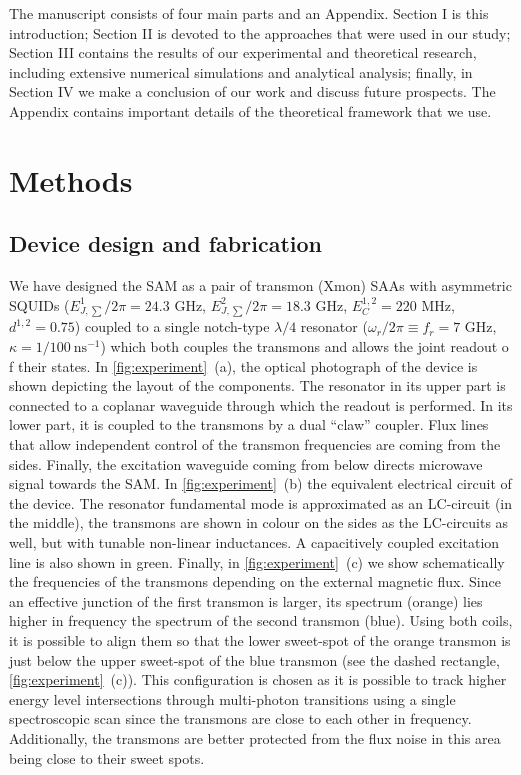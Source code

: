 \documentclass[%
 prx,
 amsmath,amssymb,
 reprint,%
]{revtex4-1}
\begin{document}
The manuscript consists of four main parts and an Appendix. Section I is this introduction; Section II is devoted to the approaches that were used in our study; Section III contains the results of our experimental and theoretical research, including extensive numerical simulations and analytical analysis; finally, in Section IV we make a conclusion of our work and discuss future prospects. The Appendix contains important details of the theoretical framework that we use.

\section{Methods}

\subsection{Device design and fabrication}
We have designed the SAM as a pair of transmon (Xmon) SAAs with asymmetric SQUIDs\cite{hutchings2017tunable} ($E^1_{J, \sum}/2\pi = 24.3$ GHz, $E^2_{J,\sum}/2\pi = 18.3$ GHz, $E^{1,2}_C = 220$ MHz, $d^{1,2} =0.75$) coupled to a single notch-type\cite{probst2015efficient} $\lambda/4$ resonator ($\omega_r/2\pi \equiv f_r = 7$ GHz, $\kappa = 1/100\ \text{ns}^{-1}$) which both couples\cite{majer2007coupling} the transmons and allows the joint\cite{chow2010detecting} readout o	f their states. In \autoref{fig:experiment}~(a), the optical photograph of the device is shown depicting the layout of the components. The resonator in its upper part is connected to a coplanar waveguide through which the readout is performed. In its lower part, it is coupled to the transmons by a dual ``claw''\cite{barends2013coherent} coupler. Flux lines that allow independent control of the transmon frequencies are coming from the sides. Finally, the excitation waveguide coming from below directs microwave signal towards the SAM. In \autoref{fig:experiment}~(b) the equivalent electrical circuit of the device. The resonator fundamental mode is approximated as an LC-circuit (in the middle), the transmons are shown in colour on the sides as the LC-circuits as well, but with tunable non-linear inductances. A capacitively coupled excitation line is also shown in green. Finally, in \autoref{fig:experiment}~(c) we show schematically the frequencies of the transmons depending on the external magnetic flux. Since an effective junction of the first transmon is larger, its spectrum (orange) lies higher in frequency the spectrum of the second transmon (blue). Using both coils, it is possible to align them so that the lower sweet-spot of the orange transmon is just below the upper sweet-spot of the blue transmon (see the dashed rectangle,  \autoref{fig:experiment}~(c)). This configuration is chosen as it is possible to track higher energy level intersections through multi-photon transitions using a single spectroscopic scan since the transmons are close to each other in frequency. Additionally, the transmons are better protected from the flux noise in this area being close to their sweet spots.
\end{document}
